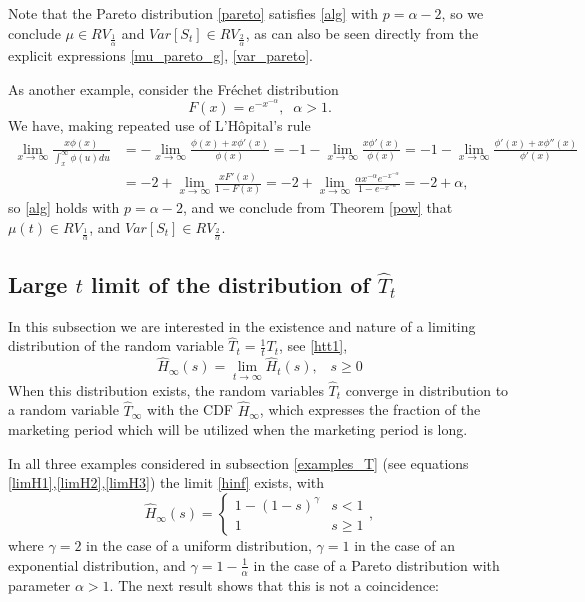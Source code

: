 \documentclass{article}
\numberwithin{equation}{section}
\begin{document}
Note that the Pareto distribution 
\eqref{pareto} 
satisfies \eqref{alg} with $p=\alpha-2$, so we conclude $\mu\in RV_{\frac{1}{\alpha}}$ and $Var[S_t]\in RV_{\frac{2}{\alpha}}$, as can also be seen directly from the explicit expressions \eqref{mu_pareto_g}, \eqref{var_pareto}.

As another example, consider the Fr\'echet distribution
\begin{equation}\label{Frechet}F(x)=e^{-x^{-\alpha}},\;\;\alpha>1.\end{equation}
We have, making repeated use of L'H\^opital's rule
\begin{align*}\lim_{x\rightarrow \infty} \frac{x\phi(x)}{\int_x^{\infty}\phi(u)du}
&=-\lim_{x\rightarrow \infty} \frac{\phi(x)+x\phi'(x)}{\phi(x)}
=-1-\lim_{x\rightarrow \infty} \frac{x\phi'(x)}{\phi(x)}=-1-\lim_{x\rightarrow \infty}\frac{\phi'(x)+x\phi''(x)}{\phi'(x)}\\&=-2+\lim_{x\rightarrow \infty}\frac{xF'(x)}{1-F(x)}=-2+\lim_{x\rightarrow \infty}\frac{\alpha x^{-\alpha}e^{-x^{-\alpha}}}{1-e^{-x^{-\alpha}}}=-2+\alpha,\end{align*}
so \eqref{alg} holds with $p=\alpha-2$, and we conclude from
Theorem \ref{pow} that $\mu(t)\in RV_{\frac{1}{\alpha}}$, and $Var[S_t]\in RV_{\frac{2}{\alpha}}$.



\subsection{Large $t$ limit of the distribution of $\hat{T}_t$}
\label{T_large}

In this subsection we are interested in
the existence and nature of a limiting distribution of the random variable $\hat{T}_t=\frac{1}{t}T_t$,
see \eqref{htt1},
\begin{equation}\label{hinf}\hat{H}_{\infty}(s)=\lim_{t\rightarrow\infty} \hat{H}_t(s),\;\;\;s\geq 0
\end{equation}
When this distribution exists, the random variables $\hat{T}_t$ converge in distribution to a random variable 
$\hat{T}_\infty$ with the CDF $\hat{H}_\infty$, which expresses the fraction of the marketing period which will be utilized when the marketing period is long.

In all three examples considered in subsection
\ref{examples_T} (see equations \eqref{limH1},\eqref{limH2},\eqref{limH3}) the limit \eqref{hinf} exists, with
\begin{equation}\label{limHg}\hat{H}_{\infty}(s)=\begin{cases}
1-(1-s)^{\gamma} & s<1\\
1 & s\geq 1
\end{cases},\end{equation}
where $\gamma=2$ in the case of a uniform distribution,
$\gamma=1$ in the case of an exponential distribution, and $\gamma=1-\frac{1}{\alpha}$ in the case of a
Pareto distribution with parameter $\alpha>1$. The next result shows that this is not a coincidence:
\end{document}
